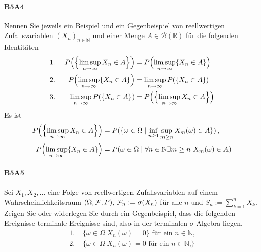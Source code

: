 \documentclass{article}
\begin{document}
\paragraph{B5A4}
Nennen Sie jeweils ein Beispiel und ein Gegenbeispiel von reellwertigen Zufallsvariablen $(X_n)_{n\in\mathbb{N}}$ und einer Menge $A\in\mathcal{B}(\mathbb{R})$ für die folgenden Identitäten
  \begin{alignat*}{2}
&\text{1.~}&P\Bigl(\Bigl\{\limsup_{n\to\infty}X_n\in A\Bigr\}\Bigr)&=P\Bigl(\limsup_{n\to\infty}\{X_n\in A\}\Bigr)\\
&\text{2.~}&P\Bigl(\limsup_{n\to\infty}\{X_n\in A\}\Bigr)&=\limsup_{n\to\infty}P(\{X_n\in A\})\\
&\text{3.~}&\limsup_{n\to\infty}P(\{X_n\in A\})&=P\Bigl(\Bigl\{\limsup_{n\to\infty}X_n\in A\Bigr\}\Bigr)
\end{alignat*}
Es ist
\begin{align*}
  P\Bigl(\Bigl\{\limsup_{n\to\infty}X_n\in A\Bigr\}\Bigr)
  &=P(\{\omega\in\Omega\mid \inf_{n\geq1}\sup_{m\geq n}X_m(\omega) \in A\})\,,\\
  P\Bigl(\limsup_{n\to\infty}\{X_n\in A\}\Bigr)
  &=P(\omega\in\Omega\mid \forall n\in\mathbb{N}\exists m\geq n~X_m(\omega)\in A)
\end{align*}
\newpage

\paragraph{B5A5}
Sei $X_1,X_2,\dots$ eine Folge von reellwertigen Zufallsvariablen auf einem Wahrscheinlichkeitsraum $(\Omega,{\cal F},P)$, ${\cal F}_n:=\sigma(X_n)$ für alle $n$ und $S_n:=\sum_{k=1}^nX_k$.
Zeigen Sie oder widerlegen Sie durch ein Gegenbeispiel, dass die folgenden Ereignisse terminale Ereignisse sind, also in der terminalen $\sigma$-Algebra liegen.
\begin{align*}
  \text{1.~}&\{\omega\in\Omega|X_n(\omega)=0\}\text{ für ein $n\in\mathbb{N}$,}\\
  \text{2.~}&\{\omega\in\Omega|X_n(\omega)=0\text{ für ein $n\in\mathbb{N}$,}\}
\end{align*}
\newpage


\end{document}
